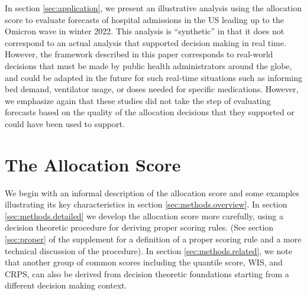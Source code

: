 \documentclass{article}\usepackage[]{graphicx}\usepackage[]{xcolor}
\begin{document}
In section \ref{sec:application}, we present an illustrative analysis using the allocation score to evaluate forecasts of hospital admissions in the US leading up to the Omicron wave in winter 2022.
This analysis is ``synthetic'' in that it does not correspond to an actual analysis that supported decision making in real time.
However, the framework described in this paper corresponds to real-world decisions that must be made by public health administrators around the globe, and could be adapted in the future for such real-time situations such as informing bed demand, ventilator usage, or doses needed for specific medications.
However, we emphasize again that these studies did not take the step of evaluating forecasts based on the quality of the allocation decisions that they supported or could have been used to support.



\section{The Allocation Score}
\label{sec:methods}

We begin with an informal description of the allocation score and some examples illustrating its key characteristics in section \ref{sec:methods.overview}. In section \ref{sec:methods.detailed} we develop the allocation score more carefully, using a decision theoretic procedure for deriving proper scoring rules. (See section \ref{sec:proper} of the supplement for a definition of a proper scoring rule
and a more technical discussion of the procedure). In section \ref{sec:methods.related}, we note that another group of common scores including the quantile score, WIS, and CRPS, can also be derived from decision theoretic foundations \textemdash starting from a different decision making context.
\end{document}
